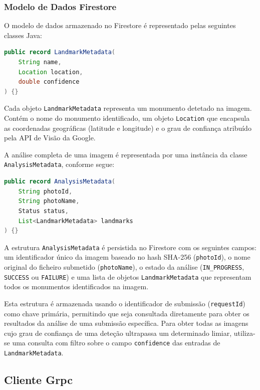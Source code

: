 \subsubsection{Modelo de Dados Firestore}
\label{ssec:grpc_server_firestore_model}

O modelo de dados armazenado no Firestore é representado pelas seguintes
classes Java:

\begin{lstlisting}[language=java, caption={Representação de um monumento identificado}, label={lst:landmark-metadata}]
public record LandmarkMetadata(
    String name,
    Location location,
    double confidence
) {}
\end{lstlisting}

Cada objeto \texttt{LandmarkMetadata} representa um monumento detetado na
imagem. Contém o nome do monumento identificado, um objeto \texttt{Location}
que encapsula as coordenadas geográficas (latitude e longitude) e o grau de
confiança atribuído pela API de Visão da Google.

A análise completa de uma imagem é representada por uma instância da classe
\texttt{AnalysisMetadata}, conforme segue:

\begin{lstlisting}[language=java, caption={Metadados associados a uma submissão}, label={lst:analysis-metadata}]
public record AnalysisMetadata(
    String photoId,
    String photoName,
    Status status,
    List<LandmarkMetadata> landmarks
) {}
\end{lstlisting}

A estrutura \texttt{AnalysisMetadata} é persistida no Firestore com os
seguintes campos: um identificador único da imagem baseado no hash SHA-256
(\texttt{photoId}), o nome original do ficheiro submetido (\texttt{photoName}),
o estado da análise (\texttt{IN\_PROGRESS}, \texttt{SUCCESS} ou
\texttt{FAILURE}) e uma lista de objetos \texttt{LandmarkMetadata} que
representam todos os monumentos identificados na imagem.

Esta estrutura é armazenada usando o identificador de submissão
(\texttt{requestId}) como chave primária, permitindo que seja consultada
diretamente para obter os resultados da análise de uma submissão específica.
Para obter todas as imagens cujo grau de confiança de uma deteção ultrapassa um
determinado limiar, utiliza-se uma consulta com filtro sobre o campo
\texttt{confidence} das entradas de \texttt{LandmarkMetadata}.

\subsection{Cliente Grpc}
\label{ssec:grpc_client}

